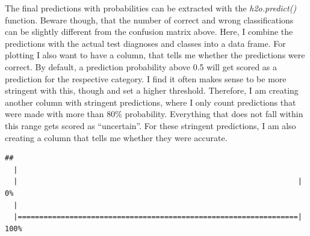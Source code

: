\documentclass[]{article}
\newenvironment{Shaded}{\begin{snugshade}}{\end{snugshade}}
\newcommand{\KeywordTok}[1]{\textcolor[rgb]{0.13,0.29,0.53}{\textbf{{#1}}}}
\newcommand{\DataTypeTok}[1]{\textcolor[rgb]{0.13,0.29,0.53}{{#1}}}
\newcommand{\StringTok}[1]{\textcolor[rgb]{0.31,0.60,0.02}{{#1}}}
\newcommand{\NormalTok}[1]{{#1}}
\begin{document}
The final predictions with probabilities can be extracted with the
\emph{h2o.predict()} function. Beware though, that the number of correct
and wrong classifications can be slightly different from the confusion
matrix above. Here, I combine the predictions with the actual test
diagnoses and classes into a data frame. For plotting I also want to
have a column, that tells me whether the predictions were correct. By
default, a prediction probability above 0.5 will get scored as a
prediction for the respective category. I find it often makes sense to
be more stringent with this, though and set a higher threshold.
Therefore, I am creating another column with stringent predictions,
where I only count predictions that were made with more than 80\%
probability. Everything that does not fall within this range gets scored
as ``uncertain''. For these stringent predictions, I am also creating a
column that tells me whether they were accurate.

\begin{Shaded}
\end{Shaded}

\begin{verbatim}
## 
  |                                                                       
  |                                                                 |   0%
  |                                                                       
  |=================================================================| 100%
\end{verbatim}
\end{document}
